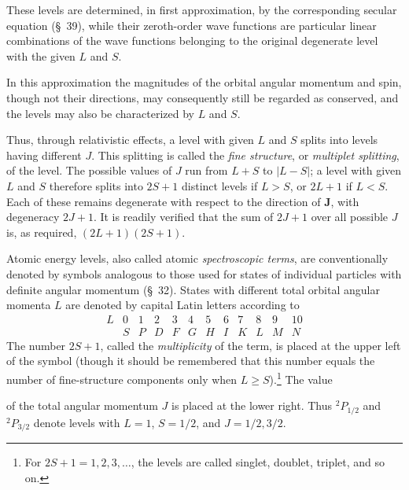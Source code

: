 These levels are determined, in first approximation, by the corresponding secular equation (\S~39), while their zeroth-order wave functions are particular linear combinations of the wave functions belonging to the original degenerate level with the given $L$ and $S$.

In this approximation the magnitudes of the orbital angular momentum and spin, though not their directions, may consequently still be regarded as conserved, and the levels may also be characterized by $L$ and $S$.

Thus, through relativistic effects, a level with given $L$ and $S$ splits into levels having different $J$. This splitting is called the \emph{fine structure}, or \emph{multiplet splitting}, of the level. The possible values of $J$ run from $L+S$ to $|L-S|$; a level with given $L$ and $S$ therefore splits into $2S+1$ distinct levels if $L>S$, or $2L+1$ if $L<S$. Each of these remains degenerate with respect to the direction of $\mathbf J$, with degeneracy $2J+1$. It is readily verified that the sum of $2J+1$ over all possible $J$ is, as required, $(2L+1)(2S+1)$.

Atomic energy levels, also called atomic \emph{spectroscopic terms}, are conventionally denoted by symbols analogous to those used for states of individual particles with definite angular momentum (\S~32). States with different total orbital angular momenta $L$ are denoted by capital Latin letters according to
\[
\begin{array}{c|rrrrrrrrrrr}
L&0&1&2&3&4&5&6&7&8&9&10\\
 &S&P&D&F&G&H&I&K&L&M&N
\end{array}
\]
The number $2S+1$, called the \emph{multiplicity} of the term, is placed at the upper left of the symbol (though it should be remembered that this number equals the number of fine-structure components only when $L\geqslant S$).\footnote{For $2S+1=1,2,3,\ldots$, the levels are called singlet, doublet, triplet, and so on.} The value

of the total angular momentum $J$ is placed at the lower right. Thus ${}^{2}P_{1/2}$ and ${}^{2}P_{3/2}$ denote levels with $L=1$, $S=1/2$, and $J=1/2,3/2$.

